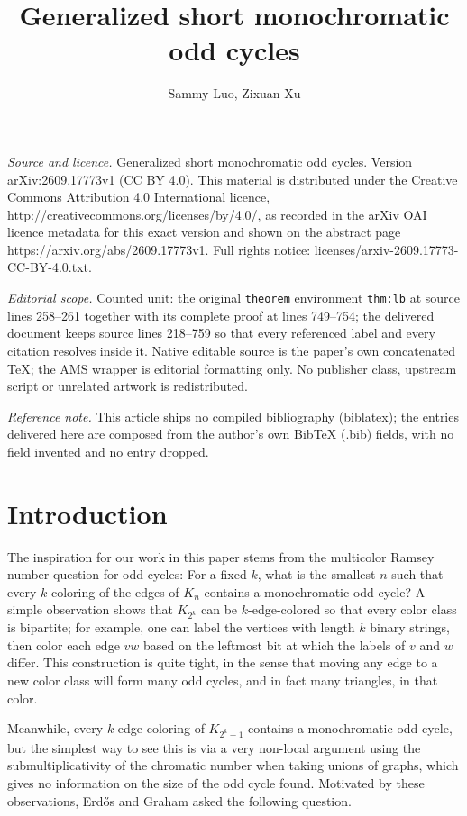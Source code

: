 \documentclass[10pt,a4paper]{amsart}
\numberwithin{theorem}{section}
\begin{document}
\title[Generalized short monochromatic odd cycles]{Generalized short monochromatic odd cycles}
\author{Sammy Luo, Zixuan Xu}
\date{}
\maketitle
\noindent\emph{Source and licence.} Generalized short monochromatic odd cycles. Version arXiv:2609.17773v1 (CC BY 4.0). This material is distributed under the Creative Commons Attribution 4.0 International licence, http://creativecommons.org/licenses/by/4.0/, as recorded in the arXiv OAI licence metadata for this exact version and shown on the abstract page https://arxiv.org/abs/2609.17773v1. Full rights notice: licenses/arxiv-2609.17773-CC-BY-4.0.txt.\par\smallskip
\noindent\textit{Editorial scope.} Counted unit: the original \texttt{theorem} environment \texttt{thm:lb} at source lines 258--261 together with its complete proof at lines 749--754; the delivered document keeps source lines 218--759 so that every referenced label and every citation resolves inside it. Native editable source is the paper's own concatenated TeX; the AMS wrapper is editorial formatting only. No publisher class, upstream script or unrelated artwork is redistributed.
\par\smallskip\noindent\textit{Reference note.} This article ships no compiled bibliography (biblatex); the entries delivered here are composed from the author's own BibTeX (.bib) fields, with no field invented and no entry dropped.
\section{Introduction}
The inspiration for our work in this paper stems from the multicolor Ramsey number question for odd cycles: For a fixed $k$, what is the smallest $n$ such that every $k$-coloring of the edges of $K_n$ contains a monochromatic odd cycle? A simple observation shows that $K_{2^k}$ can be $k$-edge-colored so that every color class is bipartite; for example, one can label the vertices with length $k$ binary strings, then color each edge $vw$ based on the leftmost bit at which the labels of $v$ and $w$ differ. This construction is quite tight, in the sense that moving any edge to a new color class will form many odd cycles, and in fact many triangles, in that color.

Meanwhile, every $k$-edge-coloring of $K_{2^k+1}$ contains a monochromatic odd cycle, but the simplest way to see this is via a very non-local argument using the submultiplicativity of the chromatic number when taking unions of graphs, which gives no information on the size of the odd cycle found. 
Motivated by these observations, Erd\H{o}s and Graham asked the following question.
\end{document}
